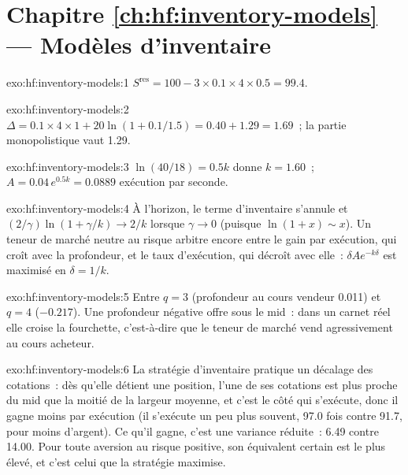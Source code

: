 \section*{Chapitre \ref{ch:hf:inventory-models} --- Modèles d'inventaire}

\begin{solution}{exo:hf:inventory-models:1}
$S^{\mathrm{res}}=100-3\times0.1\times4\times0.5=99.4$.
\end{solution}

\begin{solution}{exo:hf:inventory-models:2}
$\Delta=0.1\times4\times1+20\ln(1+0.1/1.5)=0.40+1.29=1.69$~; la partie monopolistique vaut 1.29.
\end{solution}

\begin{solution}{exo:hf:inventory-models:3}
$\ln(40/18)=0.5k$ donne $k=1.60$~; $A=0.04\,e^{0.5k}=0.0889$ exécution par seconde.
\end{solution}

\begin{solution}{exo:hf:inventory-models:4}
À l'horizon, le terme d'inventaire s'annule et $(2/\gamma)\ln(1+\gamma/k)\to2/k$ lorsque $\gamma\to0$ (puisque $\ln(1+x)\sim x$). Un teneur de marché neutre au risque
arbitre encore entre le gain par exécution, qui croît avec la profondeur, et le taux d'exécution, qui décroît avec elle~: $\delta Ae^{-k\delta}$ est maximisé en
$\delta=1/k$.
\end{solution}

\begin{solution}{exo:hf:inventory-models:5}
Entre $q=3$ (profondeur au cours vendeur 0.011) et $q=4$ ($-0.217$). Une profondeur négative offre sous le mid~: dans un carnet réel elle croise la fourchette, c'est-à-dire que le teneur de
marché vend agressivement au cours acheteur.
\end{solution}

\begin{solution}{exo:hf:inventory-models:6}
La stratégie d'inventaire pratique un décalage des cotations~: dès qu'elle détient une position, l'une de ses cotations est plus proche du mid que la moitié de la largeur moyenne, et c'est le
côté qui s'exécute, donc il gagne moins par exécution (il s'exécute un peu plus souvent, 97.0 fois contre 91.7, pour moins d'argent). Ce qu'il gagne, c'est une variance réduite~:
6.49 contre 14.00. Pour toute aversion au risque positive, son équivalent certain est le plus élevé, et c'est celui que la stratégie maximise.
\end{solution}

